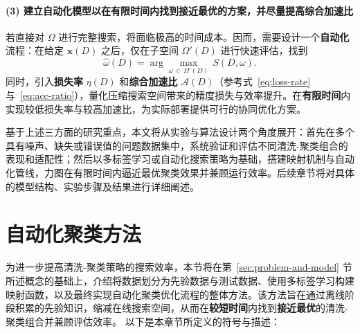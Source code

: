 \documentclass[10pt]{article} %
\numberwithin{equation}{section}
\begin{document}
\paragraph{(3) 建立自动化模型以在有限时间内找到接近最优的方案，并尽量提高综合加速比}
若直接对 \(\Omega\) 进行完整搜索，将面临极高的时间成本。因而，需要设计一个\textbf{自动化}流程：在给定 \(\mathbf{x}(D)\) 之后，仅在子空间 \(\Omega'(D)\) 进行快速评估，找到
\begin{equation}\label{eq:local best strategy}
  \hat{\omega}(D) 
  = 
  \arg\max_{\omega \,\in\,\Omega'(D)} \, S(D,\omega).
\end{equation}
同时，引入\textbf{损失率} \(\eta(D)\) 和\textbf{综合加速比} \(\mathcal{A}(D)\)（参考式~\eqref{eq:loss-rate} 与~\eqref{eq:acc-ratio}），量化压缩搜索空间带来的精度损失与效率提升。在\textbf{有限时间}内实现较低损失率与较高加速比，为实际部署提供可行的协同优化方案。

基于上述三方面的研究重点，本文将从实验与算法设计两个角度展开：首先在多个具有噪声、缺失或错误值的问题数据集中，系统验证和评估不同清洗-聚类组合的表现和适配性；然后以多标签学习或自动化搜索策略为基础，搭建映射机制与自动化管线，力图在有限时间内逼近最优聚类效果并兼顾运行效率。后续章节将对具体的模型结构、实验步骤及结果进行详细阐述。


\section{自动化聚类方法}
\label{sec:autoML}

为进一步提高清洗-聚类策略的搜索效率，本节将在第~\ref{sec:problem-and-model} 节所述概念的基础上，介绍将数据划分为先验数据与测试数据、使用多标签学习构建映射函数，以及最终实现自动化聚类优化流程的整体方法。该方法旨在通过离线阶段积累的先验知识，缩减在线搜索空间，从而在\textbf{较短时间}内找到\textbf{接近最优}的清洗-聚类组合并兼顾评估效率。
以下是本章节所定义的符号与描述：
\end{document}
